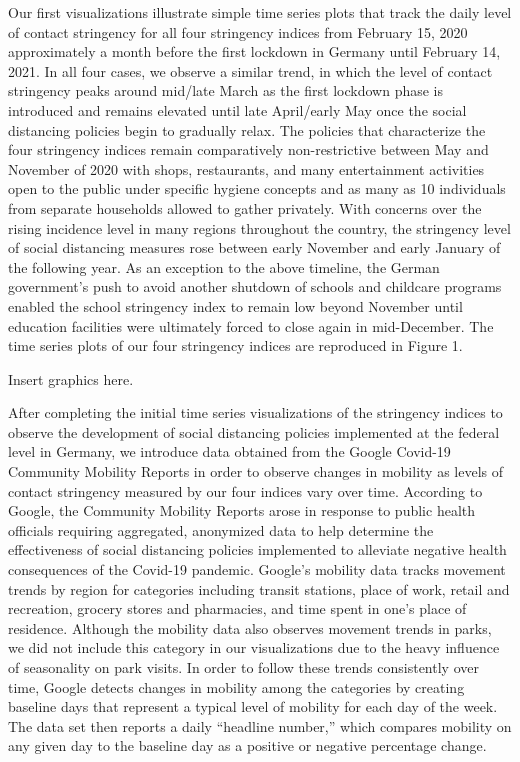 Our first visualizations illustrate simple time series plots that track the daily level of contact stringency for all four stringency indices from February 15, 2020 approximately a month before the first lockdown in Germany until February 14, 2021. In all four cases, we observe a similar trend, in which the level of contact stringency peaks around mid/late March as the first lockdown phase is introduced and remains elevated until late April/early May once the social distancing policies begin to gradually relax. The policies that characterize the four stringency indices remain comparatively non-restrictive between May and November of 2020 with shops, restaurants, and many entertainment activities open to the public under specific hygiene concepts and as many as 10 individuals from separate households allowed to gather privately. With concerns over the rising incidence level in many regions throughout the country, the stringency level of social distancing measures rose between early November and early January of the following year. As an exception to the above timeline, the German government’s push to avoid another shutdown of schools and childcare programs enabled the school stringency index to remain low beyond November until education facilities were ultimately forced to close again in mid-December. The time series plots of our four stringency indices are reproduced in Figure 1.  

Insert graphics here. 

After completing the initial time series visualizations of the stringency indices to observe the development of social distancing policies implemented at the federal level in Germany, we introduce data obtained from the Google Covid-19 Community Mobility Reports in order to observe changes in mobility as levels of contact stringency measured by our four indices vary over time. According to Google, the Community Mobility Reports arose in response to public health officials requiring aggregated, anonymized data to help determine the effectiveness of social distancing policies implemented to alleviate negative health consequences of the Covid-19 pandemic. Google’s mobility data tracks movement trends by region for categories including transit stations, place of work, retail and recreation, grocery stores and pharmacies, and time spent in one’s place of residence. Although the mobility data also observes movement trends in parks, we did not include this category in our visualizations due to the heavy influence of seasonality on park visits. In order to follow these trends consistently over time, Google detects changes in mobility among the categories by creating baseline days that represent a typical level of mobility for each day of the week. The data set then reports a daily “headline number,” which compares mobility on any given day to the baseline day as a positive or negative percentage change. 

